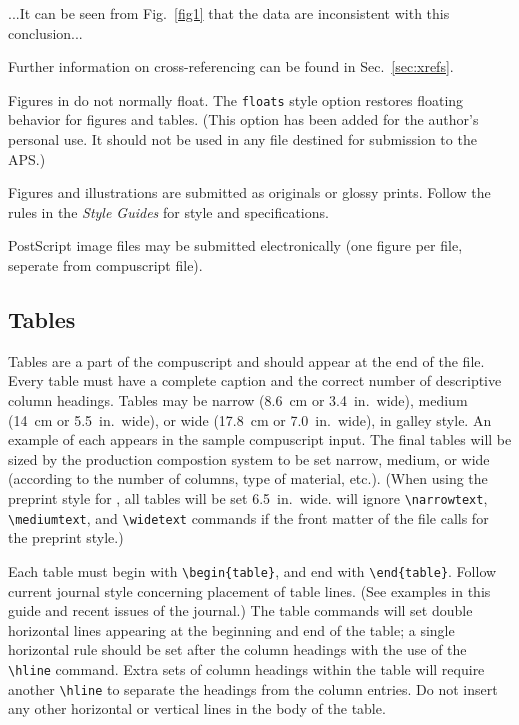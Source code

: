 
\bigskip

 ...It can be seen from Fig.\ \ref{fig1} that
the data are inconsistent with this conclusion...

\bigskip

\noindent
Further information on cross-referencing can be found in
Sec.~\ref{sec:xrefs}.

Figures in \REVTeX{} do not normally float. The \verb+floats+ style option
restores floating behavior for figures and tables. (This option has been
added for the author's personal use. It should not be used in any file
destined for submission to the APS.)

Figures and illustrations are submitted as originals or glossy prints.
Follow the rules in the {\em Style Guides}  for style and
specifications.

PostScript image files may be submitted electronically (one figure per
file, seperate from compuscript file).

\subsection{Tables}
\label{sec:tables}

Tables are a part of the compuscript and should appear at the end of the
file.  Every table must have a complete caption and the correct number of
descriptive column headings.  Tables may be narrow (8.6~cm or 3.4~in.\
wide), medium (14~cm or 5.5~in.\ wide), or wide (17.8~cm or  7.0~in.\
wide), in galley style. An example of each appears in the sample
compuscript input. The final tables will be sized by the production
compostion system to be set
narrow, medium, or wide (according to the number of columns, type of
material, etc.). (When using the preprint style for \REVTeX{}, all tables
will be set 6.5~in.\ wide.  \REVTeX{} will ignore \verb+\narrowtext+,
\verb+\mediumtext+, and \verb+\widetext+ commands if the front matter of
the file calls for the preprint style.)

Each table must begin with \verb+\begin{table}+, and end with
\verb+\end{table}+. Follow current journal style concerning
placement of table lines.  (See examples in this guide and recent issues of
the journal.)  The table commands will set double horizontal
lines appearing at the beginning and end of the table; a single horizontal
rule should be set after the column headings with the use of the
\verb+\hline+ command. Extra sets of column headings within the table will
require another \verb+\hline+ to separate the headings from the column
entries. Do not insert any other horizontal or vertical lines in the body
of the table.

